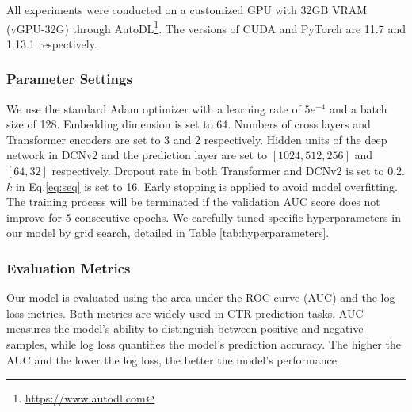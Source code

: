 \documentclass[sigconf, nonacm, screen]{acmart}
\begin{document}
All experiments were conducted on a customized GPU with 32GB VRAM (vGPU-32G) through AutoDL\footnote{\url{https://www.autodl.com}}. 
The versions of CUDA and PyTorch are 11.7 and 1.13.1 respectively.

\subsubsection{Parameter Settings}
\begin{table}[t!]
  \centering
  \caption{Hyperparameters of our model.}
  \label{tab:hyperparameters}
\end{table}
We use the standard Adam optimizer with a learning rate of \(5e^{-4}\) and a batch size of 128.
Embedding dimension is set to 64. Numbers of cross layers and Transformer encoders are set to 3 and 2 respectively.
Hidden units of the deep network in DCNv2 and the prediction layer are set to \([1024, 512, 256]\) and \([64, 32]\) respectively.
Dropout rate in both Transformer and DCNv2 is set to 0.2.
\(k\) in Eq.\ref{eq:seq} is set to 16.
Early stopping is applied to avoid model overfitting.
The training process will be terminated if the validation AUC score does not improve for 5 consecutive epochs.
We carefully tuned specific hyperparameters in our model by grid search, detailed in Table \ref{tab:hyperparameters}.

\subsubsection{Evaluation Metrics}
Our model is evaluated using the area under the ROC curve (AUC) and the log loss metrics.
Both metrics are widely used in CTR prediction tasks.
AUC measures the model's ability to distinguish between positive and negative samples, while log loss quantifies the model's prediction accuracy.
The higher the AUC and the lower the log loss, the better the model's performance.
\end{document}
